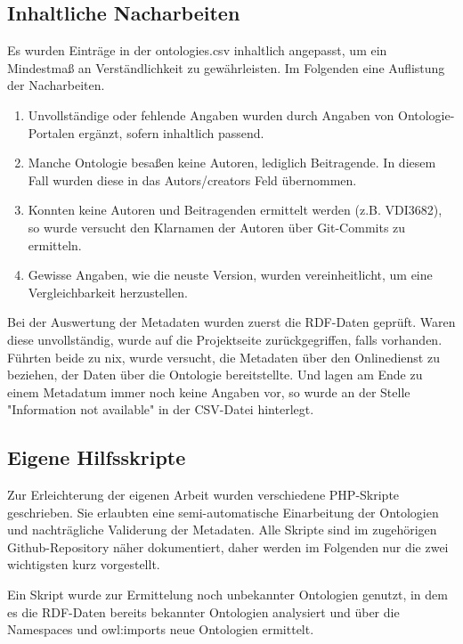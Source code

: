 \documentclass{article}
\begin{document}
\subsection{Inhaltliche Nacharbeiten}

Es wurden Einträge in der ontologies.csv inhaltlich angepasst, um ein Mindestmaß an Verständlichkeit zu gewährleisten.
Im Folgenden eine Auflistung der Nacharbeiten.

\begin{enumerate}
    \item Unvollständige oder fehlende Angaben wurden durch Angaben von Ontologie-Portalen ergänzt, sofern inhaltlich passend.
    \item Manche Ontologie besaßen keine Autoren, lediglich Beitragende. In diesem Fall wurden diese in das Autors/creators Feld übernommen.
    \item Konnten keine Autoren und Beitragenden ermittelt werden (z.B. VDI3682), so wurde versucht den Klarnamen der Autoren über Git-Commits zu ermitteln.
    \item Gewisse Angaben, wie die neuste Version, wurden vereinheitlicht, um eine Vergleichbarkeit herzustellen.
\end{enumerate}

Bei der Auswertung der Metadaten wurden zuerst die RDF-Daten geprüft. Waren diese unvollständig, wurde auf die Projektseite zurückgegriffen, falls vorhanden.
Führten beide zu nix, wurde versucht, die Metadaten über den Onlinedienst zu beziehen, der Daten über die Ontologie bereitstellte.
Und lagen am Ende zu einem Metadatum immer noch keine Angaben vor, so wurde an der Stelle "Information not available" in der CSV-Datei hinterlegt.

\subsection{Eigene Hilfsskripte}

Zur Erleichterung der eigenen Arbeit wurden verschiedene PHP-Skripte geschrieben.
Sie erlaubten eine semi-automatische Einarbeitung der Ontologien und nachträgliche Validerung der Metadaten.
Alle Skripte sind im zugehörigen Github-Repository näher dokumentiert, daher werden im Folgenden nur die zwei wichtigsten kurz vorgestellt.

Ein Skript wurde zur Ermittelung noch unbekannter Ontologien genutzt, in dem es die RDF-Daten bereits bekannter Ontologien analysiert und über die Namespaces und owl:imports neue Ontologien ermittelt.
\end{document}
